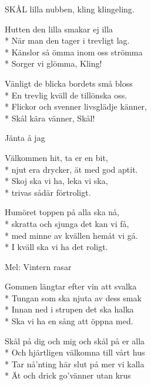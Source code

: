 \begin{SongText}
\begin{SongVerse}
        SKÅL lilla nubben, kling klingeling. 
    \end{SongVerse}
    \begin{SongVerse}
        Hutten den lilla smakar ej illa\\*%
        När man den tager i trevligt lag.\\*%
        Känslor så ömma inom oss strömma\\*%
        Sorger vi glömma, Kling!
    \end{SongVerse}
    \begin{SongVerse}
        Vänligt de blicka bordets små bloss\\*%
        En trevlig kväll de tillönska oss.\\*%
        Flickor och svenner livsglädje känner,\\*%
        Skål kära vänner, Skål! 
    \end{SongVerse}
\end{SongText}

\begin{SongText}[Välkomstvisa]
    \begin{SongInfo}
        Jänta å jag
    \end{SongInfo}
    \begin{SongVerse}
        Välkommen hit, ta er en bit,\\*%
        njut era drycker, ät med god aptit.\\*%
        Skoj ska vi ha, leka vi ska,\\*%
        trivas sådär förtroligt.
    \end{SongVerse}
    \begin{SongVerse}
        Humöret toppen på alla ska nå,\\*%
        skratta och sjunga det kan vi få,\\*%
        med minne av kvällen hemåt vi gå.\\*%
        I kväll ska vi ha det roligt.
    \end{SongVerse}
\end{SongText}

\begin{SongText}
    \begin{SongInfo}
        Mel: Vintern rasar
    \end{SongInfo}
    \begin{SongVerse}
        Gommen längtar efter vin att svalka\\*%
        Tungan som ska njuta av dess smak\\*%
        Innan ned i strupen det ska halka\\*%
        Ska vi ha en sång att öppna med.
    \end{SongVerse}
    \begin{SongVerse}
        Skål på dig och mig och skål på er alla\\*%
        Och hjärtligen välkomna till vårt hus\\*%
        Tar nå’nting här slut på mer vi kalla\\*%
        Ät och drick go’vänner utan krus
    \end{SongVerse}
\end{SongText}
\newpage